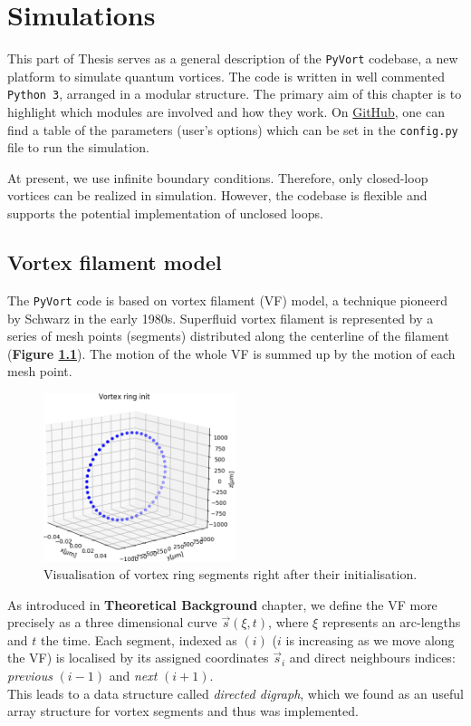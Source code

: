 \chapter{Simulations}

This part of Thesis serves as a general description of the \texttt{PyVort} codebase, a new platform to simulate quantum vortices. The code is written in well commented \texttt{Python 3}, arranged in a modular structure. The primary aim of this chapter is to highlight which modules are involved and how they work.
On \href{https://github.com/KuboBahyl/superfluid}{GitHub}, one can find a table of the parameters (user's options) which can be set in the \texttt{config.py} file to run the simulation.

At present, we use infinite boundary conditions. Therefore, only closed-loop vortices can be realized in simulation. However, the codebase is flexible and supports the potential implementation of unclosed loops.

\section{Vortex filament model}

The \texttt{PyVort} code is based on vortex filament (VF) model, a technique pioneerd by Schwarz \cite{schwarz} in the early 1980s. Superfluid vortex filament is represented by a series of mesh points (segments) distributed along the centerline of the filament (\textbf{Figure \ref{example_ring}}). The motion of the whole VF is summed up by the motion of each mesh point.

\begin{figure}[h]
	\centering
	\includegraphics[width=0.5\textwidth]{graphics/simul/ring_init_crop}
	\caption{Visualisation of vortex ring segments right
after their initialisation.}
	\label{example_ring}
\end{figure}

As introduced in \textbf{Theoretical Background} chapter, we define the VF more precisely as a three dimensional curve $\vec{s}(\xi, t)$, where $\xi$ represents an arc-lengths and $t$ the time.
Each segment, indexed as $(i)$ ($i$ is increasing as we move along the VF) is localised by its assigned coordinates $\vec{s}_i$ and direct neighbours indices: \textit{previous} $(i-1)$ and \textit{next} $(i+1)$.\\
This leads to a data structure called \textit{directed digraph}, which we found as an useful array structure for vortex segments and thus was implemented.

